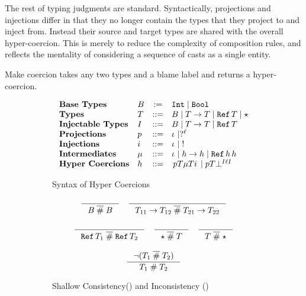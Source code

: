 \documentclass[acmtog, authorversion, acmlarge]{acmart}
\begin{document}
The rest of typing judgments are standard. Syntactically, projections
and injections differ in that they no longer contain the types that they
project to and inject from. Instead their source and target types
are shared with the overall hyper-coercion. This is merely to reduce
the complexity of composition rules, and reflects the mentality of
considering a sequence of casts as a single entity.

Make coercion takes any two types and a blame label and returns a
hyper-coercion.
\begin{figure}[tbh]
  \small
  \begin{subfigure}{.5\textwidth}
    \[
    \begin{array}{llcl}
      \textbf{Base Types} &
      B & := & \texttt{Int} \mid \texttt{Bool} \\
      \textbf{Types} &
      T    & ::= & B \mid T  \to  T \mid \texttt{Ref} \, T \mid \star \\
      \textbf{Injectable Types} &
      I    & ::= & B \mid T  \to  T \mid \texttt{Ref} \, T \\
      \textbf{Projections}&
      p  & ::= & \iota_{} \mid  ?^{\ell} \\
      \textbf{Injections}&
      i  & ::= & \iota_{} \mid \;  ! \\
      \textbf{Intermediates}&
      \mu  & ::= & \iota_{} \mid h  \to  h \mid \texttt{Ref} \, h \, h\\
      \textbf{Hyper Coercions}&
      h   & ::= & \, p T \mu T i \, \mid p T \bot^{I \ell I}
    \end{array}
    \]
    \caption{Syntax of Hyper Coercions}
    \label{fig:hcSyntax}
  \end{subfigure}%
  \begin{subfigure}{0.5\textwidth}
    \begin{gather*}
      \inference{}{\B \sct \B}
      \quad
      \inference{}{\Fn{\T_{11}}{\T_{12}} \sct \Fn{\T_{21}}{\T_{22}}}
      \\[2ex]
      \inference{}{\Ref{\T_{1}} \sct \Ref{\T_{2}}}
      \quad
      \inference{}{\Dyn \sct \T}
      \quad
      \inference{}{\T \sct \Dyn}
      \\[2ex]
      \inference{\neg (\T_1 \sct \T_2)}{\T_1 \sic \T_2}
    \end{gather*}
    \caption{Shallow Consistency(\sct) and Inconsistency (\sic)}
    \label{fig:shallowConsistency}
  \end{subfigure}
  \begin{subfigure}{.5\textwidth}

\end{subfigure}
\end{figure}
\end{document}

